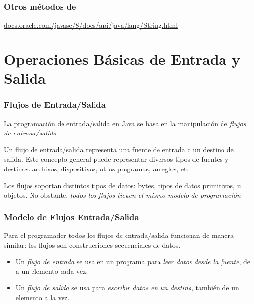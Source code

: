 \documentclass{beamer}
\begin{document}
  

\begin{frame}
  \frametitle{Otros métodos de }

  \url{docs.oracle.com/javase/8/docs/api/java/lang/String.html}
  
\end{frame}

\section{Operaciones Básicas de Entrada y Salida}

\begin{frame}
  \frametitle{Flujos de Entrada/Salida}
  \begin{block}{}
    La programación de entrada/salida en Java se basa en la
    manipulación de \emph{flujos de entrada/salida}
  \end{block}

  \begin{block}{}
    Un flujo de entrada/salida representa una fuente de entrada o un
    destino de salida. Este concepto general puede representar
    diversos tipos de fuentes y destinos: archivos, dispositivos,
    otros programas, arreglos, etc.    
  \end{block}

  \begin{block}{}
    Los flujos soportan distintos tipos de datos: bytes, tipos de
    datos primitivos, u objetos. No obstante, \emph{todos los flujos
      tienen el mismo modelo de programación}
  \end{block}
\end{frame}

\begin{frame}
  \frametitle{Modelo de Flujos Entrada/Salida}

  Para el programador todos los flujos de entrada/salida funcionan de
  manera similar: los flujos son construcciones secuenciales de datos.

  \begin{itemize}
  \item Un \emph{flujo de entrada} se usa en un programa para
    \emph{leer datos desde la fuente}, de a un elemento cada vez.
    
  \item Un \emph{flujo de salida} se usa para \emph{escribir datos en
      un destino}, también de un elemento a la vez.
  \end{itemize}
  
\end{frame}
\end{document}
